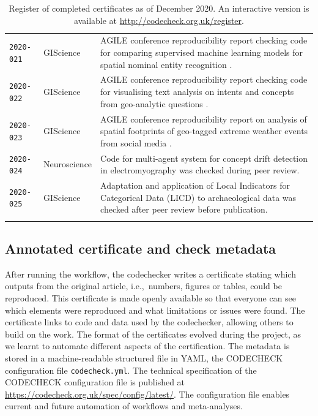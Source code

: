 \documentclass[12pt]{article}
\begin{document}
\begin{table}
\begin{tabular}{llp{12cm}}
    \texttt{2020-021}  \cite{cert-2020-021} & GIScience & AGILE conference reproducibility report checking code for comparing supervised machine learning models for spatial nominal entity recognition \cite{Medad2020}. \\ %
    \texttt{2020-022}  \cite{cert-2020-022} & GIScience & AGILE conference reproducibility report checking code for visualising text analysis on intents and concepts from geo-analytic questions \cite{Xu2020}. \\ %
    \texttt{2020-023}  \cite{cert-2020-023} & GIScience & AGILE conference reproducibility report on analysis of spatial footprints of geo-tagged extreme weather events from social media \cite{Owuor2020}. \\
    \texttt{2020-024}  \cite{cert-2020-024} & Neuroscience & Code for multi-agent system for concept drift detection in electromyography \cite{vieira_driftage_2020} was checked during peer review. \\ %
    \texttt{2020-025}  \cite{cert-2020-025} & GIScience & Adaptation and application of Local Indicators for Categorical Data (LICD) to archaeological data \cite{carrer_application_2021} was checked after peer review before publication. \\ %
    \\ \bottomrule
  \end{tabular}
  \caption{Register of completed certificates as of December 2020. An interactive version
  is available at \url{http://codecheck.org.uk/register}.
  }
  \label{tab:register}
\end{table}

\subsection*{Annotated certificate and check metadata}\label{annotated-certificate}

After running the workflow, the codechecker writes a certificate
stating which outputs from the original article, i.e.,~numbers,
figures or tables, could be reproduced.  This certificate is made
openly available so that everyone can see which
elements were reproduced and what limitations or issues were found.
The certificate links to code and data used by the codechecker,
allowing others to build on the work.  The format of the certificates
evolved during the project, as we learnt to automate different
aspects of the certification.  The metadata
is stored in a machine-readable structured file in YAML, the CODECHECK
configuration file \texttt{codecheck.yml}.
The technical specification of the CODECHECK configuration file is
published at \url{https://codecheck.org.uk/spec/config/latest/}.  The
configuration file enables current and future automation of workflows
and meta-analyses.
\end{document}
